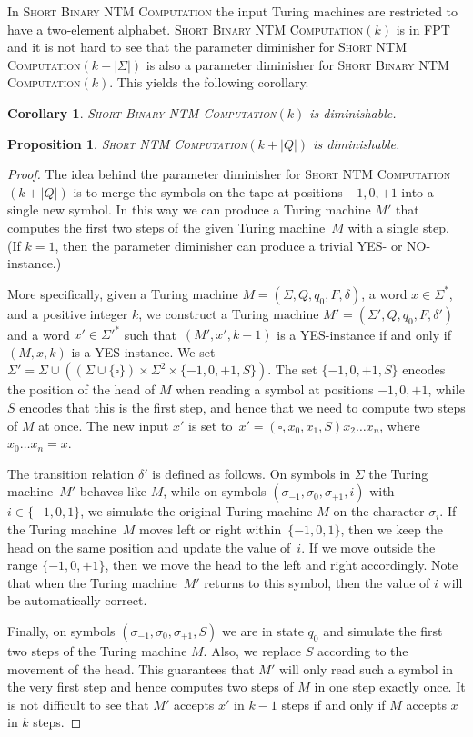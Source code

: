 \documentclass[11pt,a4,USenglish]{article}
\newcommand{\prob}[1]{\textsc{#1}}
\newcommand{\pprob}[2]{\prob{#1}$(#2)$}
\newcommand{\FPT}{\textnormal{FPT}}
\newcommand{\YES}{YES}
\newcommand{\NO}{NO}
\theoremstyle{definition}
\theoremstyle{plain}
\newtheorem{corollary}{Corollary}
\newtheorem{proposition}{Proposition}
\theoremstyle{remark}
\begin{document}
%
In \prob{Short Binary NTM Computation} the input Turing machines are restricted to have a two-element alphabet. 
\pprob{Short Binary NTM Computation}{k} is in \FPT{}~\cite{DowneyF99} and it is not hard to see that the parameter diminisher for \pprob{Short NTM Computation}{k+|\Sigma|} is also a parameter diminisher for \pprob{Short Binary NTM Computation}{k}. 
\iflong{}
This yields the following corollary.
  \begin{corollary}
  \pprob{Short Binary NTM Computation}{k} is diminishable.
  \end{corollary}
\fi{}
%
\begin{proposition}
\pprob{Short NTM Computation}{k+|Q|} is diminishable.
\end{proposition}
\begin{proof}
The idea behind the parameter diminisher for \pprob{Short NTM Computation}{k+|Q|} is to merge the symbols on the tape at positions $-1,0,+1$ into a single new symbol. In this way we can produce a Turing machine $M'$ that computes the first two steps of the given Turing machine~$M$ with a single step. (If $k=1$, then the parameter diminisher can produce a trivial \YES{}- or \NO-instance.)

More specifically, given a Turing machine $M=(\Sigma, Q, q_0, F, \delta)$, a word $x\in\Sigma^*$, and a positive integer $k$, we construct a Turing machine $M'=(\Sigma',Q,q_0,F,\delta')$ and a word $x'\in\Sigma'^*$ such that~$(M',x',k-1)$ is a \YES{}-instance if and only if $(M,x,k)$ is a \YES{}-instance.
We set~$\Sigma'=\Sigma\cup\left((\Sigma\cup\{\square\})\times\Sigma^2\times\{-1,0,+1,S\}\right)$.
The set $\{-1,0,+1,S\}$ encodes the position of the head of $M$ when reading a symbol at positions $-1,0,+1$, while $S$ encodes that this is the first step, and hence that we need to compute two steps of $M$ at once.
The new input $x'$ is set to~$x'=(\square,x_0,x_1,S) x_2 \dots x_n$, where $x_0\dots x_n=x$.

The transition relation $\delta'$ is defined as follows. On symbols in $\Sigma$ the Turing machine~$M'$ behaves like $M$, while on symbols $(\sigma_{-1},\sigma_{0},\sigma_{+1},i)$ with $i\in\{-1, 0, 1\}$, we simulate the original Turing machine $M$ on the character $\sigma_i$. 
If the Turing machine~$M$ moves left or right within~$\{-1,0,1\}$, then we keep the head on the same position and update the value of~$i$. If we move outside the range $\{-1,0,+1\}$, then we move the head to the left and right accordingly. Note that when the Turing machine~$M'$ returns to this symbol, then the value of $i$ will be automatically correct.

Finally, on symbols $(\sigma_{-1},\sigma_{0},\sigma_{+1},S)$ we are in state $q_0$ and simulate the first two steps of the Turing machine $M$. Also, we replace $S$ according to the movement of the head. This guarantees that $M'$ will only read such a symbol in the very first step and hence computes two steps of $M$ in one step exactly once. It is not difficult to see that $M'$ accepts $x'$ in $k-1$ steps if and only if $M$ accepts $x$ in $k$ steps.
\end{proof}
\end{document}
